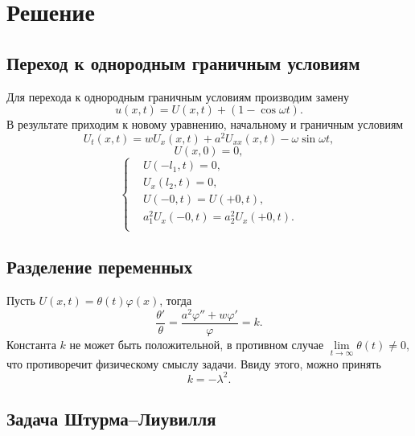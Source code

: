 \documentclass[12pt, a4paper]{article}
\begin{document}
\section{Решение}
\subsection{Переход к однородным граничным условиям}
Для перехода к однородным граничным условиям производим замену
\begin{equation}
  u(x,t) = U(x,t) + (1 - \cos \omega t).
\end{equation}
В результате приходим к новому уравнению, начальному и граничным условиям
\begin{equation}
  U_t(x,t) = w U_x(x,t) + a^2 U_{xx}(x,t) - \omega\sin\omega t,
  \label{eq:14}
\end{equation}
\begin{equation}
  U(x,0) = 0,
\end{equation}
\begin{equation}
  \left\{
  \begin{aligned}
    & U(-l_1,t) = 0, \\
    & U_x(l_2,t) = 0, \\
    & U(-0, t) = U(+0, t), \\
    & a_1^2 U_{x}(-0, t) = a_2^2 U_{x}(+0, t). \\
  \end{aligned}
  \right.
  \label{eq:15}
\end{equation}
\subsection{Разделение переменных}
Пусть $ U(x,t)=\theta(t)\varphi(x) $, тогда
\begin{equation}
  \frac{\theta'}{\theta}=\frac{a^2\varphi''+w\varphi'}{\varphi}=k.
  \label{eq:1}
\end{equation}
Константа $ k $ не может быть положительной, в противном случае $\lim\limits_{t \rightarrow \infty}\theta(t) \ne 0$, что противоречит физическому смыслу задачи. Ввиду этого, можно принять
\begin{equation}
  k=-\lambda^2.
  \label{eq:2}
\end{equation}
\subsection{Задача Штурма--Лиувилля}
\end{document}
